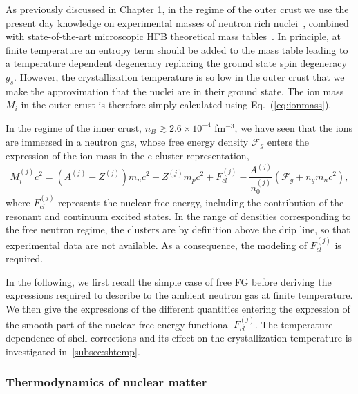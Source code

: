 As previously discussed in Chapter 1, in the regime of the outer crust we use 
the present day knowledge on experimental masses of neutron rich 
nuclei~\cite{Huang2017,Welker2017}, combined with state-of-the-art 
microscopic HFB theoretical mass tables~\cite{Goriely2013}. 
In principle, at finite temperature an entropy term should be added to the mass
table leading to a temperature dependent degeneracy replacing the ground state
spin degeneracy $g_s$. However, the crystallization temperature is so low in
the outer crust that we make the approximation that the nuclei are in their
ground state. 
The ion mass $M_{i}$ in the outer crust is therefore simply calculated using 
Eq.~(\ref{eq:ionmass}).

In the regime of the inner crust, $n_B \gtrsim 2.6 \times 10^{-4}$ fm$^{-3}$, 
we have seen that the ions are immersed in a neutron gas, whose free energy 
density $\mathcal{F}_g$ enters the expression of the ion mass in the e-cluster 
representation,
%
\begin{equation}
  M_{i}^{(j)} c^2 = (A^{(j)} - Z^{(j)})m_n c^2 + Z^{(j)} m_p c^2 
  + F_{cl}^{(j)} - \frac{A^{(j)}}{n_0^{(j)}}(\mathcal{F}_g + n_g m_n c^2),
\end{equation}
%
where $F_{cl}^{(j)}$ represents the nuclear free energy, including the
contribution of the resonant and continuum excited states.
In the range of densities corresponding to the free neutron regime, the 
clusters are by definition above the drip line, so that experimental data are 
not available. As a consequence, the modeling of $F_{cl}^{(j)}$ is required.

In the following, we first recall the simple case of free FG before
deriving the expressions required to describe to the ambient neutron gas at 
finite temperature. 
We then give the expressions of the different quantities entering the 
expression of the smooth part of the nuclear free energy functional 
$F_{cl}^{(j)}$. The temperature dependence of shell corrections and its effect 
on the crystallization temperature is investigated in~\ref{subsec:shtemp}.

\subsubsection{Thermodynamics of nuclear matter}

